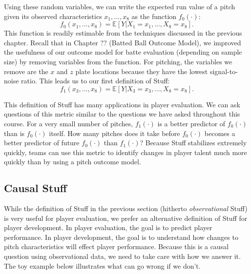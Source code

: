 \documentclass{article}
\begin{document}
    Using these random variables, we can write the expected run value of a pitch given its observed characteristics $x_1, ..., x_8$ as the function $f_0(\cdot)$:
    \begin{equation*}
      f_0(x_1, ..., x_8) = \mathbb{E}[Y | X_1 = x_1, ..., X_8 = x_8].
    \end{equation*}
    This function is readily estimable from the techniques discussed in the previous chapter. Recall that in Chapter ?? (Batted Ball Outcome Model), we improved the usefulness of our outcome model for batte evaluation (depending on sample size) by removing variables from the function. For pitching, the variables we remove are the $x$ and $z$ plate locations because they have the lowest signal-to-noise ratio. This leads us to our first definition of Stuff:
    \begin{equation}
      \label{eqn:observational-stuff}
      f_1(x_3, ..., x_8) = \mathbb{E}[Y | X_3 = x_3, ..., X_8 = x_8].
    \end{equation}

    This definition of Stuff has many applications in player evaluation. We can ask questions of this metric similar to the questions we have asked throughout this course. For a very small number of pitches, $f_1(\cdot)$ is a better predictor of $f_0(\cdot)$ than is $f_0(\cdot)$ itself. How many pitches does it take before $f_0(\cdot)$ becomes a better predictor of future $f_0(\cdot)$ than $f_1(\cdot)$? Because Stuff stabilizes extremely quickly, teams can use this metric to identify changes in player talent much more quickly than by using a pitch outcome model.

  \subsection{\sc Causal Stuff}

    While the definition of Stuff in the previous section (hitherto {\it observational} Stuff) is very useful for player evaluation, we prefer an alternative definition of Stuff for player development. In player evaluation, the goal is to predict player performance. In player development, the goal is to understand how changes to pitch characteristics will effect player performance. Because this is a causal question using observational data, we need to take care with how we answer it. The toy example below illustrates what can go wrong if we don't.
\end{document}
